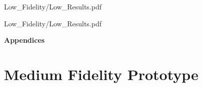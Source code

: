 \documentclass[a4 paper, 12pt]{article}
\begin{document}
        \pagebreak
        
                    {Low_Fidelity/Low_Results.pdf}
    
                    {Low_Fidelity/Low_Results.pdf}

    \pagebreak
    


\pagebreak
\begin{center}
    \Huge \textbf{Appendices}
    \section{Medium Fidelity Prototype}
\end{center}

    \pagebreak
    

    \pagebreak    
    
    
\end{document}
